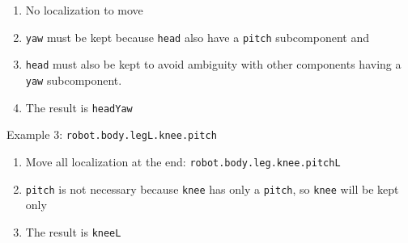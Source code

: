 \documentclass[a4paper]{article}
\newcommand\liststyleLii{%
\renewcommand\theenumi{\arabic{enumi}}
\renewcommand\theenumii{\arabic{enumii}}
\renewcommand\theenumiii{\arabic{enumiii}}
\renewcommand\theenumiv{\arabic{enumiv}}
\renewcommand\labelenumi{\theenumi.}
\renewcommand\labelenumii{\theenumii.}
\renewcommand\labelenumiii{\theenumiii.}
\renewcommand\labelenumiv{\theenumiv.}
}
\newcommand\liststyleLiii{%
\renewcommand\theenumi{\arabic{enumi}}
\renewcommand\theenumii{\arabic{enumii}}
\renewcommand\theenumiii{\arabic{enumiii}}
\renewcommand\theenumiv{\arabic{enumiv}}
\renewcommand\labelenumi{\theenumi.}
\renewcommand\labelenumii{\theenumii.}
\renewcommand\labelenumiii{\theenumiii.}
\renewcommand\labelenumiv{\theenumiv.}
}
\begin{document}
\liststyleLii
\begin{enumerate}
\item {\sffamily
No localization to move}
\item {\sffamily
\texttt{yaw} must be kept because \texttt{head} also have a
\texttt{pitch} subcomponent and }
\item {\sffamily
\texttt{head} must also be kept to avoid ambiguity with other components
having a \texttt{yaw} subcomponent.}
\item {\sffamily
The result is \texttt{headYaw}}
\end{enumerate}
{\sffamily
Example 3: \texttt{robot.body.legL.knee.pitch}}

\liststyleLiii
\begin{enumerate}
\item {\sffamily
Move all localization at the end: \texttt{robot.body.leg.knee.pitchL}}
\item {\sffamily
\texttt{pitch} is not necessary because \texttt{knee} has only a
\texttt{pitch}, so \texttt{knee} will be kept only}
\item {\sffamily
The result is \texttt{kneeL}}
\end{enumerate}
\end{document}

